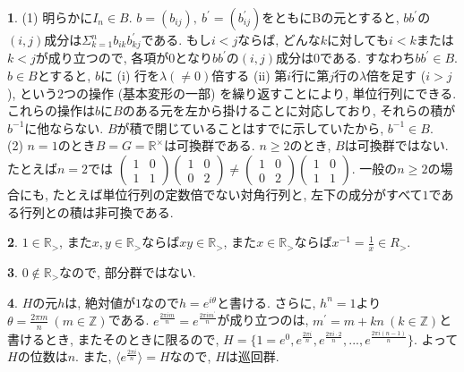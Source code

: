 \documentclass{amsart}
\theoremstyle{definition}
\newtheorem{ans}{}
\numberwithin{ans}{subsection}
\begin{document}
\begin{ans}
  (1) 明らかに$I_n \in B$.
  $b = (b_{ij}),\ b^\prime = (b^\prime_{ij})$をともにBの元とすると,
  $bb^\prime$の$(i, j)$成分は$\Sigma_{k = 1}^nb_{ik}b^\prime_{kj}$である.
  もし$i < j$ならば, どんな$k$に対しても$i < k$または$k < j$が成り立つので,
  各項が$0$となり$bb^\prime$の$(i, j)$成分は$0$である. すなわち$bb^\prime \in B$.
  $b \in B$とすると, $b$に
  (i) 行を$\lambda (\neq 0)$倍する
  (ii) 第$i$行に第$j$行の$\lambda$倍を足す ($i > j$),
  という$2$つの操作 (基本変形の一部) を繰り返すことにより, 単位行列にできる.
  これらの操作は$b$に$B$のある元を左から掛けることに対応しており, それらの積が$b^{-1}$に他ならない.
  $B$が積で閉じていることはすでに示していたから, $b^{-1} \in B$.\\
  (2) $n = 1$のとき$B = G = \mathbb{R}^\times$は可換群である.
  $n \ge 2$のとき, $B$は可換群ではない. たとえば$n = 2$では
  $\begin{pmatrix}
    1 & 0 \\
    1 & 1
  \end{pmatrix}\begin{pmatrix}
    1 & 0 \\
    0 & 2
  \end{pmatrix} \neq \begin{pmatrix}
    1 & 0 \\
    0 & 2
  \end{pmatrix}\begin{pmatrix}
    1 & 0 \\
    1 & 1
  \end{pmatrix}$.
  一般の$n \ge 2$の場合にも, たとえば単位行列の定数倍でない対角行列と,
  左下の成分がすべて$1$である行列との積は非可換である.
\end{ans}

\begin{ans}
  $1 \in \mathbb{R}_>$,
  また$x, y \in \mathbb{R}_>$ならば$xy \in \mathbb{R}_>$,
  また$x \in \mathbb{R}_>$ならば$x^{-1} = \frac{1}{x} \in {R}_>$.
\end{ans}

\begin{ans}
  $0 \notin \mathbb{R}_>$なので, 部分群ではない.
\end{ans}

\begin{ans}
  $H$の元$h$は, 絶対値が$1$なので$h = e^{i\theta}$と書ける.
  さらに, $h^n = 1$より$\theta = \frac{2\pi m}{n}\ (m \in \mathbb{Z})$である.
  $e^\frac{2\pi im}{n} = e^\frac{2\pi i m^\prime}{n}$が成り立つのは,
  $m^\prime = m + kn\ (k \in \mathbb{Z})$と書けるとき, またそのときに限るので,
  $H = \{1 = e^0, e^\frac{2\pi i}{n}, e^\frac{2\pi i \cdot 2}{n},..., e^\frac{2\pi i(n - 1)}{n}\}$.
  よって$H$の位数は$n$.
  また, $\langle e^\frac{2\pi i}{n} \rangle = H$なので, $H$は巡回群.
\end{ans}
\end{document}
